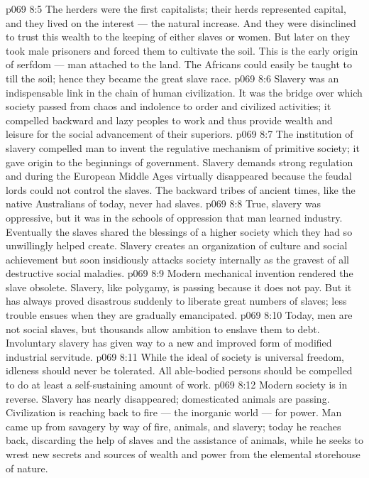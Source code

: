 \vs p069 8:5 The herders were the first capitalists; their herds represented capital, and they lived on the interest --- the natural increase. And they were disinclined to trust this wealth to the keeping of either slaves or women. But later on they took male prisoners and forced them to cultivate the soil. This is the early origin of serfdom --- man attached to the land. The Africans could easily be taught to till the soil; hence they became the great slave race.
\vs p069 8:6 \pc Slavery was an indispensable link in the chain of human civilization. It was the bridge over which society passed from chaos and indolence to order and civilized activities; it compelled backward and lazy peoples to work and thus provide wealth and leisure for the social advancement of their superiors.
\vs p069 8:7 The institution of slavery compelled man to invent the regulative mechanism of primitive society; it gave origin to the beginnings of government. Slavery demands strong regulation and during the European Middle Ages virtually disappeared because the feudal lords could not control the slaves. The backward tribes of ancient times, like the native Australians of today, never had slaves.
\vs p069 8:8 True, slavery was oppressive, but it was in the schools of oppression that man learned industry. Eventually the slaves shared the blessings of a higher society which they had so unwillingly helped create. Slavery creates an organization of culture and social achievement but soon insidiously attacks society internally as the gravest of all destructive social maladies.
\vs p069 8:9 \pc Modern mechanical invention rendered the slave obsolete. Slavery, like polygamy, is passing because it does not pay. But it has always proved disastrous suddenly to liberate great numbers of slaves; less trouble ensues when they are gradually emancipated.
\vs p069 8:10 \pc Today, men are not social slaves, but thousands allow ambition to enslave them to debt. Involuntary slavery has given way to a new and improved form of modified industrial servitude.
\vs p069 8:11 While the ideal of society is universal freedom, idleness should never be tolerated. All able\hyp{}bodied persons should be compelled to do at least a self\hyp{}sustaining amount of work.
\vs p069 8:12 Modern society is in reverse. Slavery has nearly disappeared; domesticated animals are passing. Civilization is reaching back to fire --- the inorganic world --- for power. Man came up from savagery by way of fire, animals, and slavery; today he reaches back, discarding the help of slaves and the assistance of animals, while he seeks to wrest new secrets and sources of wealth and power from the elemental storehouse of nature.

